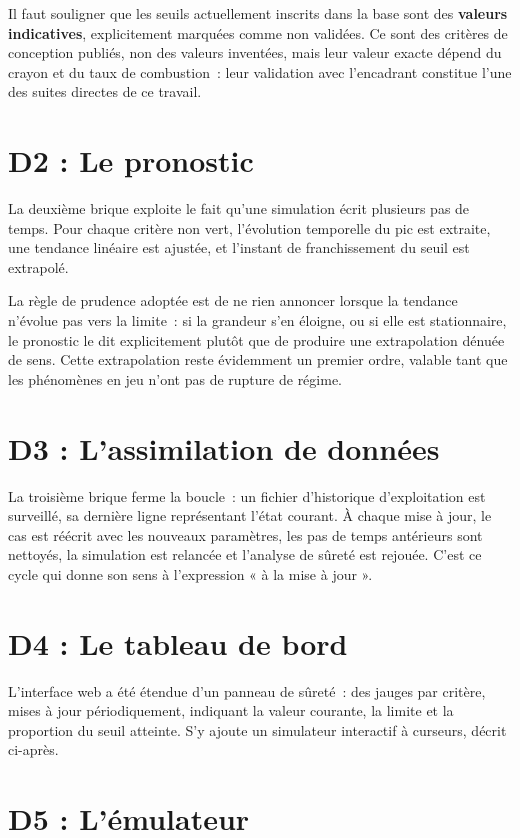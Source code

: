 \documentclass[12pt,a4paper,french]{report}
\begin{document}
Il faut souligner que les seuils actuellement inscrits dans la base sont des
\textbf{valeurs indicatives}, explicitement marquées comme non validées. Ce sont
des critères de conception publiés, non des valeurs inventées, mais leur valeur
exacte dépend du crayon et du taux de combustion~: leur validation avec
l'encadrant constitue l'une des suites directes de ce travail.

\section{D2 : Le pronostic}

La deuxième brique exploite le fait qu'une simulation écrit plusieurs pas de
temps. Pour chaque critère non vert, l'évolution temporelle du pic est extraite,
une tendance linéaire est ajustée, et l'instant de franchissement du seuil est
extrapolé.

La règle de prudence adoptée est de ne rien annoncer lorsque la tendance
n'évolue pas vers la limite~: si la grandeur s'en éloigne, ou si elle est
stationnaire, le pronostic le dit explicitement plutôt que de produire une
extrapolation dénuée de sens. Cette extrapolation reste évidemment un premier
ordre, valable tant que les phénomènes en jeu n'ont pas de rupture de régime.

\section{D3 : L'assimilation de données}

La troisième brique ferme la boucle~: un fichier d'historique d'exploitation
est surveillé, sa dernière ligne représentant l'état courant. À chaque mise à
jour, le cas est réécrit avec les nouveaux paramètres, les pas de temps
antérieurs sont nettoyés, la simulation est relancée et l'analyse de sûreté est
rejouée. C'est ce cycle qui donne son sens à l'expression « à la mise à jour ».

\section{D4 : Le tableau de bord}

L'interface web a été étendue d'un panneau de sûreté~: des jauges par critère,
mises à jour périodiquement, indiquant la valeur courante, la limite et la
proportion du seuil atteinte. S'y ajoute un simulateur interactif à curseurs,
décrit ci-après.

\section{D5 : L'émulateur}
\end{document}
